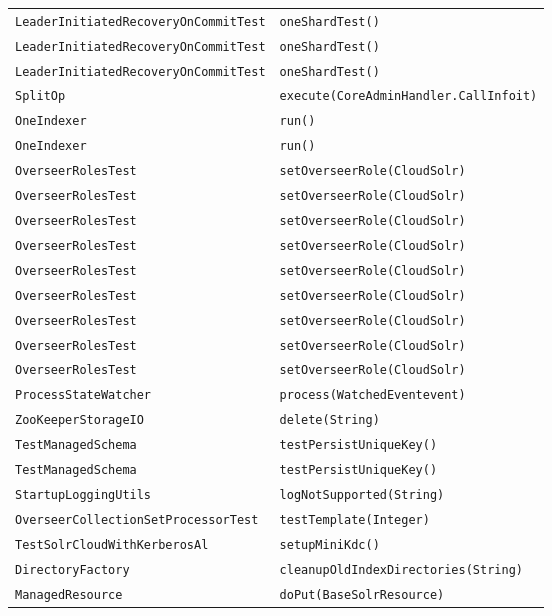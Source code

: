 \begin{center}
\begin{longtable}{ll}
\lstinline/LeaderInitiatedRecoveryOnCommitTest/&{\lstinline/oneShardTest()/}\\
\lstinline/LeaderInitiatedRecoveryOnCommitTest/&{\lstinline/oneShardTest()/}\\
\lstinline/LeaderInitiatedRecoveryOnCommitTest/&{\lstinline/oneShardTest()/}\\
\lstinline/SplitOp/&{\lstinline/execute(CoreAdminHandler.CallInfoit)/}\\
\lstinline/OneIndexer/&{\lstinline/run()/}\\
\lstinline/OneIndexer/&{\lstinline/run()/}\\
\lstinline/OverseerRolesTest/&{\lstinline/setOverseerRole(CloudSolr)/}\\
\lstinline/OverseerRolesTest/&{\lstinline/setOverseerRole(CloudSolr)/}\\
\lstinline/OverseerRolesTest/&{\lstinline/setOverseerRole(CloudSolr)/}\\
\lstinline/OverseerRolesTest/&{\lstinline/setOverseerRole(CloudSolr)/}\\
\lstinline/OverseerRolesTest/&{\lstinline/setOverseerRole(CloudSolr)/}\\
\lstinline/OverseerRolesTest/&{\lstinline/setOverseerRole(CloudSolr)/}\\
\lstinline/OverseerRolesTest/&{\lstinline/setOverseerRole(CloudSolr)/}\\
\lstinline/OverseerRolesTest/&{\lstinline/setOverseerRole(CloudSolr)/}\\
\lstinline/OverseerRolesTest/&{\lstinline/setOverseerRole(CloudSolr)/}\\
\lstinline/ProcessStateWatcher/&{\lstinline/process(WatchedEventevent)/}\\
\lstinline/ZooKeeperStorageIO/&{\lstinline/delete(String)/}\\
\lstinline/TestManagedSchema/&{\lstinline/testPersistUniqueKey()/}\\
\lstinline/TestManagedSchema/&{\lstinline/testPersistUniqueKey()/}\\
\lstinline/StartupLoggingUtils/&{\lstinline/logNotSupported(String)/}\\
\lstinline/OverseerCollectionSetProcessorTest/&{\lstinline/testTemplate(Integer)/}\\
\lstinline/TestSolrCloudWithKerberosAl/&{\lstinline/setupMiniKdc()/}\\
\lstinline/DirectoryFactory/&{\lstinline/cleanupOldIndexDirectories(String)/}\\
\lstinline/ManagedResource/&{\lstinline/doPut(BaseSolrResource)/}\\

\end{longtable}
\end{center}
